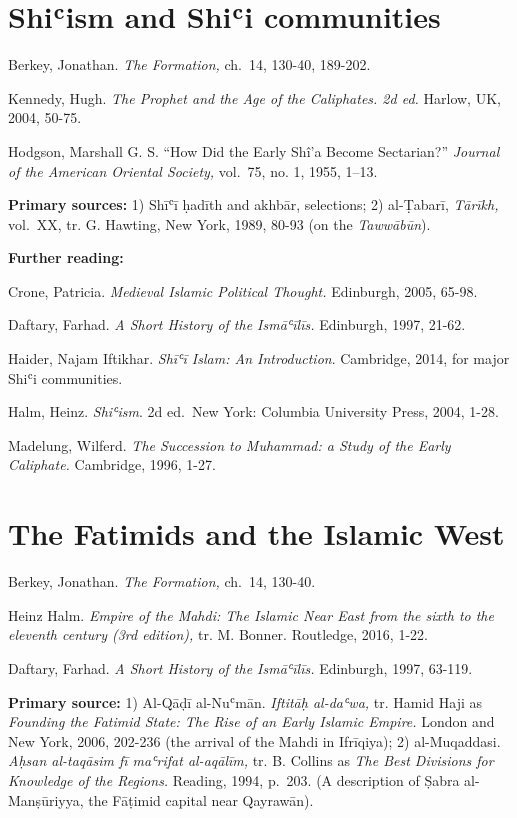 \documentclass[
]{book}
\begin{document}
\hypertarget{shiux2bfism-and-shiux2bfi-communities}{%
\chapter{Shiʿism and Shiʿi communities}\label{shiux2bfism-and-shiux2bfi-communities}}

Berkey, Jonathan. \emph{The Formation,} ch.~14, 130-40, 189-202.

Kennedy, Hugh. \emph{The Prophet and the Age of the Caliphates. 2d ed.}
Harlow, UK, 2004, 50-75.

Hodgson, Marshall G. S. ``How Did the Early Shî'a Become
Sectarian?'' \emph{Journal of the American Oriental Society,} vol.~75, no. 1, 1955, 1--13.

\textbf{Primary sources:} 1) Shīʿī ḥadīth and akhbār, selections; 2)
al-Ṭabarī, \emph{Tārīkh,} vol.~XX, tr. G. Hawting, New York, 1989, 80-93 (on
the \emph{Tawwābūn}).

\textbf{Further reading:}

Crone, Patricia. \emph{Medieval Islamic Political Thought.} Edinburgh, 2005,
65-98.

Daftary, Farhad. \emph{A Short History of the Ismāʿīlīs.} Edinburgh, 1997,
21-62.

Haider, Najam Iftikhar. \emph{Shīʿī Islam: An Introduction}. Cambridge, 2014,
for major Shiʿi communities.

Halm, Heinz. \emph{Shiʿism}. 2d ed.~New York: Columbia University Press, 2004, 1-28.

Madelung, Wilferd. \emph{The Succession to Muhammad: a Study of the Early Caliphate.} Cambridge, 1996, 1-27.

\hypertarget{the-fatimids-and-the-islamic-west}{%
\chapter{The Fatimids and the Islamic West}\label{the-fatimids-and-the-islamic-west}}

Berkey, Jonathan. \emph{The Formation,} ch.~14, 130-40.

Heinz Halm. \emph{Empire of the Mahdi: The Islamic Near East from the sixth to the eleventh century (3rd edition),} tr. M. Bonner. Routledge, 2016, 1-22.

Daftary, Farhad. \emph{A Short History of the Ismāʿīlīs.} Edinburgh, 1997, 63-119.

\textbf{Primary source:} 1) Al-Qāḍī al-Nuʿmān. \emph{Iftitāḥ al-daʿwa,} tr. Hamid
Haji as \emph{Founding the Fatimid State: The Rise of an Early Islamic
Empire.} London and New York, 2006, 202-236 (the arrival of the Mahdi in
Ifrīqiya); 2) al-Muqaddasi. \emph{Aḥsan al-taqāsim fī maʿrifat al-aqālīm,}
tr. B. Collins as \emph{The Best Divisions for Knowledge of the Regions.}
Reading, 1994, p.~203. (A description of Ṣabra al-Manṣūriyya, the
Fāṭimid capital near Qayrawān).
\end{document}
